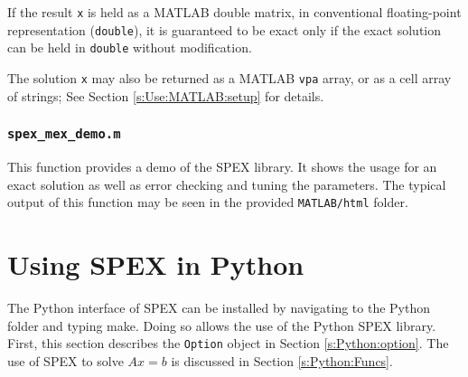 \documentclass[12pt,oneside]{book}
\theoremstyle{definition}
\begin{document}
If the result \verb|x| is held as a MATLAB double matrix, in conventional
floating-point representation (\verb|double|), it is guaranteed to be exact
only if the exact solution can be held in \verb|double| without modification.

The solution \verb|x| may also be returned as a MATLAB \verb|vpa| array, or as
a cell array of strings; See Section \ref{s:Use:MATLAB:setup} for details.


\subsection{\texttt{spex\_mex\_demo.m}}
This function provides a demo of the SPEX library. It shows the usage for an exact
solution as well as error checking and tuning the parameters. The typical output
of this function may be seen in the provided \verb|MATLAB/html| folder.



\chapter{Using SPEX in Python}\vspace{-0.75in}
The Python interface of SPEX can be installed by navigating to the Python folder and typing make. Doing so allows the use of the Python SPEX library. First, this section describes the \verb|Option| object in Section \ref{s:Python:option}. The use of SPEX to solve $Ax=b$ is discussed in Section \ref{s:Python:Funcs}.


\end{document}
